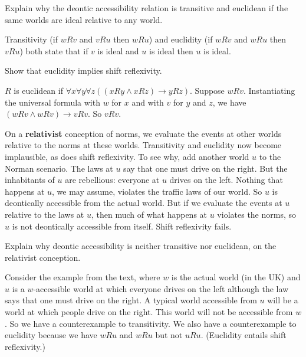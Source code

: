 
\begin{exercise}
  Explain why the deontic accessibility relation is transitive and euclidean if the same worlds are ideal relative to any world.
\end{exercise}
\begin{solution}
  Transitivity (if $wRv$ and $vRu$ then $wRu$) and euclidity (if $wRv$ and $wRu$
  then $vRu$) both state that if $v$ is ideal and $u$ is ideal then $u$ is
  ideal.
\end{solution}
\begin{exercise}
  Show that euclidity implies shift reflexivity.
\end{exercise}
\begin{solution}
  $R$ is euclidean if $\forall x \forall y \forall z((xRy \land xRz) \to yRz)$.
  Suppose $wRv$. Instantiating the universal formula with $w$ for $x$ and with
  $v$ for $y$ and $z$, we have $(wRv \land wRv) \to vRv$. So $vRv$.
\end{solution}


On a \textbf{relativist} conception of norms, we evaluate the events at other
worlds relative to the norms at these worlds. Transitivity and euclidity now
become implausible, as does shift reflexivity. To see why, add another world $u$
to the Norman scenario. The laws at $u$ say that one must drive on the right.
But the inhabitants of $u$ are rebellious: everyone at $u$ drives on the left.
Nothing that happens at $u$, we may assume, violates the traffic laws of our
world. So $u$ is deontically accessible from the actual world. But if we
evaluate the events at $u$ relative to the laws at $u$, then much of what
happens at $u$ violates the norms, so $u$ is not deontically accessible from
itself. Shift reflexivity fails.

\begin{exercise}
  Explain why deontic accessibility is neither transitive nor euclidean, on
  the relativist conception.
\end{exercise}
\begin{solution}
  Consider the example from the text, where $w$ is the actual world (in the UK)
  and $u$ is a $w$-accessible world at which everyone drives on the left
  although the law says that one must drive on the right. A typical world
  accessible from $u$ will be a world at which people drive on the right. This
  world will not be accessible from $w$. So we have a counterexample to
  transitivity. We also have a counterexample to euclidity because we have $wRu$
  and $wRu$ but not $uRu$. (Euclidity entails shift reflexivity.)
\end{solution}

